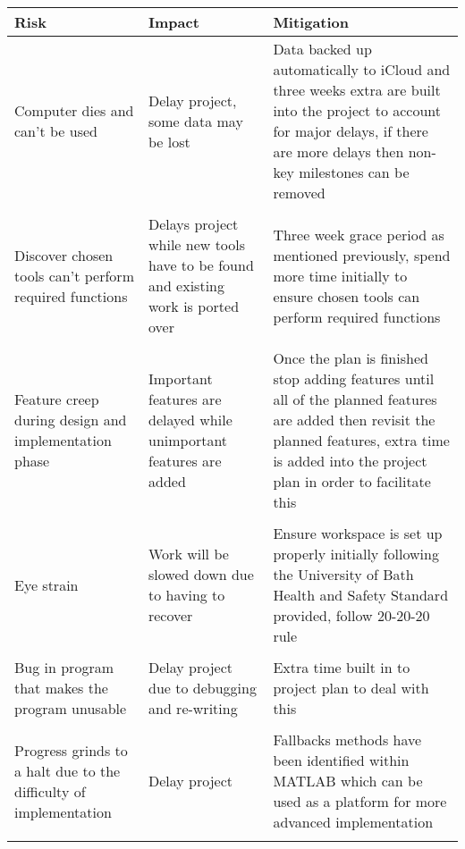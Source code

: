 
	\begin{longtabu} to \textwidth {|X|X|X|}
		\hline
		Risk & Impact & Mitigation \\\hline
		Computer dies and can't be used & Delay project, some data may be lost & Data backed up automatically to iCloud and three weeks extra are built into the project to account for major delays, if there are more delays then non-key milestones can be removed \\
		&&\\
		Discover chosen tools can't perform required functions & Delays project while new tools have to be found and existing work is ported over & Three week grace period as mentioned previously, spend more time initially to ensure chosen tools can perform required functions \\
		&&\\
		Feature creep during design and implementation phase & Important features are delayed while unimportant features are added & Once the plan is finished stop adding features until all of the planned features are added then revisit the planned features, extra time is added into the project plan in order to facilitate this \\
		&&\\
		Eye strain & Work will be slowed down due to having to recover & Ensure workspace is set up properly initially following the University of Bath Health and Safety Standard provided, follow 20-20-20 rule \\
		&&\\
		Bug in program that makes the program unusable & Delay project due to debugging and re-writing & Extra time built in to project plan to deal with this \\
		&&\\
		Progress grinds to a halt due to the difficulty of implementation & Delay project & Fallbacks methods have been identified within MATLAB which can be used as a platform for more advanced implementation \\
		&&\\
		\hline
	\end{longtabu}
